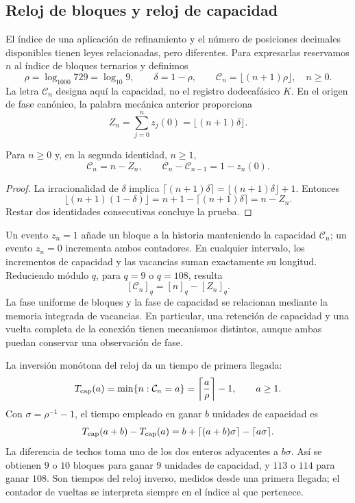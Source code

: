 \subsection{Reloj de bloques y reloj de capacidad}
\label{x_reciprocidad:mono-ampl:relojes}

El índice de una aplicación de refinamiento y el número de posiciones
decimales disponibles tienen leyes relacionadas, pero diferentes. Para
expresarlas reservamos \(n\) al índice de bloques ternarios y definimos
\[
 \rho=\log_{1000}729=\log_{10}9,\qquad
 \delta=1-\rho,\qquad
 \mathcal C_n=\lfloor(n+1)\rho\rfloor,\quad n\geq0.
\]
La letra \(\mathcal C_n\) designa aquí la capacidad, no el registro
dodecafásico \(K\). En el origen de fase canónico, la palabra mecánica
anterior proporciona
\[
 Z_n=\sum_{j=0}^{n}z_j(0)=\lfloor(n+1)\delta\rfloor.
\]

\begin{proposition}
\label{x_reciprocidad:mono-ampl:balance-capacidad}
Para \(n\geq0\) y, en la segunda identidad, \(n\geq1\),
\[
 \mathcal C_n=n-Z_n,\qquad
 \mathcal C_n-\mathcal C_{n-1}=1-z_n(0).
\]
\end{proposition}
\begin{proof}
La irracionalidad de \(\delta\) implica
\(\lceil(n+1)\delta\rceil=\lfloor(n+1)\delta\rfloor+1\).
Entonces
\[
 \lfloor(n+1)(1-\delta)\rfloor
 =n+1-\lceil(n+1)\delta\rceil=n-Z_n.
\]
Restar dos identidades consecutivas concluye la prueba.
\end{proof}

Un evento \(z_n=1\) añade un bloque a la historia manteniendo la capacidad
\(\mathcal C_n\); un evento \(z_n=0\) incrementa ambos contadores. En
cualquier intervalo, los incrementos de capacidad y las vacancias suman
exactamente su longitud. Reduciendo módulo \(q\), para \(q=9\) o
\(q=108\), resulta
\[
 [\mathcal C_n]_q=[n]_q-[Z_n]_q.
\]
La fase uniforme de bloques y la fase de capacidad se relacionan mediante
la memoria integrada de vacancias. En particular, una retención de
capacidad y una vuelta completa de la conexión tienen mecanismos
distintos, aunque ambas puedan conservar una observación de fase.

La inversión monótona del reloj da un tiempo de primera llegada:
\[
 T_{\rm cap}(a)=\min\{n:\mathcal C_n=a\}
 =\left\lceil\frac a\rho\right\rceil-1,
 \qquad a\geq1.
\]
Con \(\sigma=\rho^{-1}-1\), el tiempo empleado en ganar \(b\) unidades
de capacidad es
\[
 T_{\rm cap}(a+b)-T_{\rm cap}(a)
 =b+\lceil(a+b)\sigma\rceil-\lceil a\sigma\rceil.
\]
La diferencia de techos toma uno de los dos enteros adyacentes a
\(b\sigma\). Así se obtienen \(9\) o \(10\) bloques para ganar
\(9\) unidades de capacidad, y \(113\) o \(114\) para ganar \(108\).
Son tiempos del reloj inverso, medidos desde una primera llegada; el
contador de vueltas se interpreta siempre en el índice al que pertenece.

